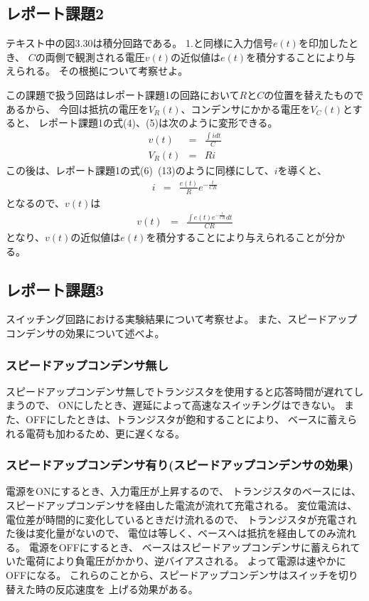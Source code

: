\documentclass[12pt]{jarticle}
\begin{document}
\subsection{レポート課題2}
\begin{shadebox}
    テキスト中の図3.30は積分回路である。
    1.と同様に入力信号$e(t)$を印加したとき、
    $C$の両側で観測される電圧$v(t)$の近似値は$e(t)$を積分することにより与えられる。
    その根拠について考察せよ。
\end{shadebox}
この課題で扱う回路はレポート課題1の回路において$R$と$C$の位置を替えたものであるから、
今回は抵抗の電圧を$V_R(t)$、コンデンサにかかる電圧を$V_C(t)$とすると、
レポート課題1の式(4)、(5)は次のように変形できる。
\begin{eqnarray}
    v(t)&=&\frac{\int idt}{C}\\
    V_R(t)&=&Ri
\end{eqnarray}
この後は、レポート課題1の式(6)~(13)のように同様にして、$i$を導くと、
\begin{eqnarray}
    i&=& \frac{e(t)}{R}e^{-\frac{t}{CR}}
\end{eqnarray}
となるので、$v(t)$は
\begin{eqnarray}
    v(t)&=&\frac{\int e(t)e^{-\frac{t}{CR}}dt}{CR}\nonumber
\end{eqnarray}
となり、$v(t)$の近似値は$e(t)$を積分することにより与えられることが分かる。

\clearpage

\subsection{レポート課題3}
\begin{shadebox}
    スイッチング回路における実験結果について考察せよ。
    また、スピードアップコンデンサの効果について述べよ。
\end{shadebox}
\subsubsection*{スピードアップコンデンサ無し}
スピードアップコンデンサ無しでトランジスタを使用すると応答時間が遅れてしまうので、
ONにしたとき、遅延によって高速なスイッチングはできない。
また、OFFにしたときは、トランジスタが飽和することにより、
ベースに蓄えられる電荷も加わるため、更に遅くなる。

\subsubsection*{スピードアップコンデンサ有り(スピードアップコンデンサの効果)}
電源をONにするとき、入力電圧が上昇するので、
トランジスタのベースには、スピードアップコンデンサを経由した電流が流れて充電される。
変位電流は、電位差が時間的に変化しているときだけ流れるので、
トランジスタが充電された後は変化量がないので、
電位は等しく、ベースへは抵抗を経由してのみ流れる。
電源をOFFにするとき、
ベースはスピードアップコンデンサに蓄えられていた電荷により負電圧がかかり、逆バイアスされる。
よって電源は速やかにOFFになる。
これらのことから、スピードアップコンデンサはスイッチを切り替えた時の反応速度を
上げる効果がある。
\end{document}

